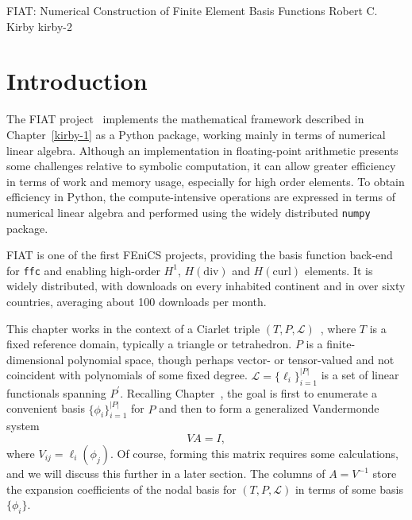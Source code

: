               {FIAT: Numerical Construction of Finite Element Basis Functions}
              {Robert C. Kirby}
              {kirby-2}

\section{Introduction}

The FIAT project~\cite{Kir04,Kir06} implements the mathematical
framework described in Chapter~\ref{kirby-1} as a Python package, working
mainly in terms of numerical linear algebra.  Although an
implementation in floating-point arithmetic presents some challenges
relative to symbolic computation, it can allow greater efficiency in terms of work and memory usage, especially for high order elements.  To
obtain efficiency in Python, the compute-intensive operations are
expressed in terms of numerical linear algebra and performed using the
widely distributed \texttt{numpy} package.

FIAT is one of the first FEniCS projects, providing the
basis function back-end for \texttt{ffc} and enabling high-order
\( H^1 \),
\( H(\mathrm{div}) \) and \( H(\mathrm{curl}) \) elements. It is widely
distributed, with downloads on every inhabited continent and in over
sixty countries, averaging  about 100 downloads per month.

This chapter works in the context of a Ciarlet triple \( (T,P,\mathcal{L}) \)~\cite{Ciarlet1978},
where \( T \) is a fixed reference domain, typically a triangle or
tetrahedron.  \( P \) is a finite-dimensional polynomial space, though
perhaps vector- or tensor-valued and not coincident with polynomials
of some fixed degree.  \( \mathcal{L} = \{ \ell_i \}_{i=1}^{|P|} \) is a set of linear functionals spanning
\( P^\prime \).  Recalling Chapter~\cite{kirby-1}, the goal is first to
enumerate a convenient basis \( \{ \phi_i \}_{i=1}^{|P|} \) for \( P
\) and then to form a generalized Vandermonde system
\[
V A = I,
\]
where \( V_{ij} = \ell_i( \phi_j) \).  Of course, forming this matrix
requires some calculations, and we will discuss this further in a
later section.
The columns of \( A = V^{-1} \) store the expansion coefficients of
the nodal basis for \( (T,P,\mathcal{L}) \) in terms of some basis \( \{ \phi_i
\} \).


